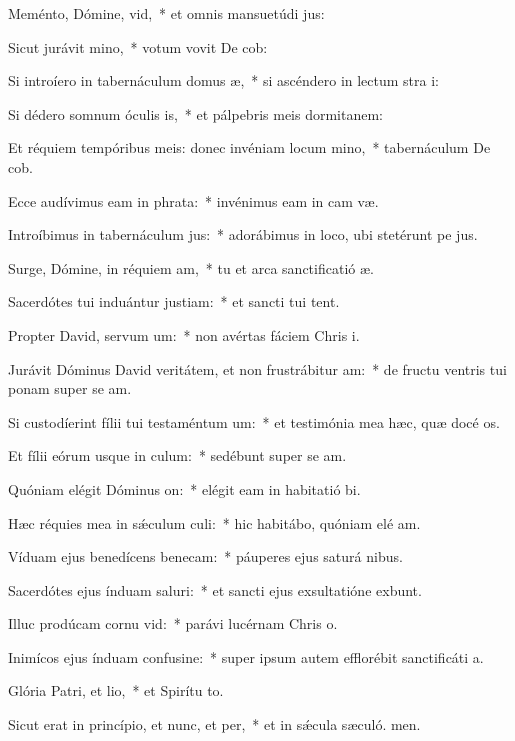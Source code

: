 \item Meménto, Dómine, vid,~* et omnis mansuetúdi jus:
\item Sicut jurávit mino,~* votum vovit De cob:
\item Si introíero in tabernáculum domus æ,~* si ascéndero in lectum stra i:
\item Si dédero somnum óculis is,~* et pálpebris meis dormitanem:
\item Et réquiem tempóribus meis: donec invéniam locum mino,~* tabernáculum De cob.
\item Ecce audívimus eam in phrata:~* invénimus eam in cam væ.
\item Introíbimus in tabernáculum jus:~* adorábimus in loco, ubi stetérunt pe jus.
\item Surge, Dómine, in réquiem am,~* tu et arca sanctificatió æ.
\item Sacerdótes tui induántur justiam:~* et sancti tui tent.
\item Propter David, servum um:~* non avértas fáciem Chris i.
\item Jurávit Dóminus David veritátem, et non frustrábitur am:~* de fructu ventris tui ponam super se am.
\item Si custodíerint fílii tui testaméntum um:~* et testimónia mea hæc, quæ docé os.
\item Et fílii eórum usque in culum:~* sedébunt super se am.
\item Quóniam elégit Dóminus on:~* elégit eam in habitatió bi.
\item Hæc réquies mea in sǽculum culi:~* hic habitábo, quóniam elé am.
\item Víduam ejus benedícens benecam:~* páuperes ejus saturá nibus.
\item Sacerdótes ejus índuam saluri:~* et sancti ejus exsultatióne exbunt.
\item Illuc prodúcam cornu vid:~* parávi lucérnam Chris o.
\item Inimícos ejus índuam confusine:~* super ipsum autem efflorébit sanctificáti a.
\item Glória Patri, et lio,~* et Spirítu to.
\item Sicut erat in princípio, et nunc, et per,~* et in sǽcula sæculó. men.
